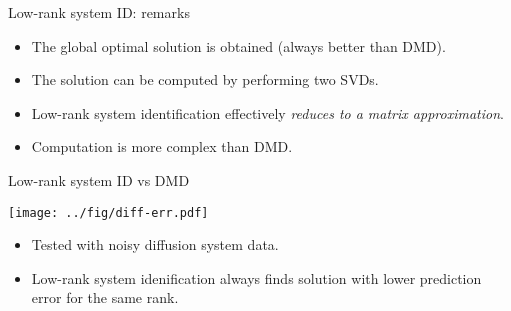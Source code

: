\documentclass[10pt]{beamer}
\newcommand{\red}{\color{red}}
\newcommand{\blue}{\color{blue}}
\begin{document}
\begin{frame}{Low-rank system ID: remarks}
  \begin{itemize}
  \item The {\blue global optimal solution} is obtained (always better than DMD).
    \vspace{0.2in}
  \item The solution can be computed by performing {\blue two SVDs}.
    \vspace{0.2in}
  \item Low-rank system identification effectively {\blue\em reduces to a matrix approximation}.
    \vspace{0.2in}
  \item {\red Computation is more complex than DMD.}
  \end{itemize}
\end{frame}

\begin{frame}{Low-rank system ID vs DMD}
  \begin{center}
    \texttt{[image: ../fig/diff-err.pdf]}
  \end{center}
  \begin{itemize}
  \item Tested with noisy diffusion system data.
    \vspace{0.1in}
  \item Low-rank system idenification always finds solution with lower prediction error for the same rank.
  \end{itemize}
\end{frame}
\end{document}
